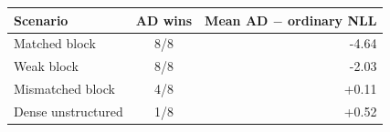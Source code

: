 \begin{tabular}{lcr}
\toprule
Scenario & AD wins & Mean AD $-$ ordinary NLL\\
\midrule
Matched block & 8/8 & -4.64\\
Weak block & 8/8 & -2.03\\
Mismatched block & 4/8 & +0.11\\
Dense unstructured & 1/8 & +0.52\\
\bottomrule
\end{tabular}
